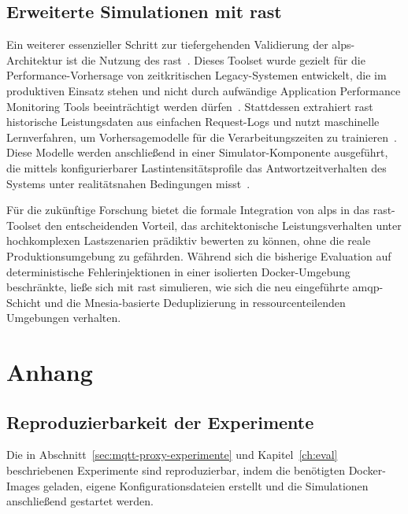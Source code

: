 \section{Erweiterte Simulationen mit \acrshort{rast}}
\label{sec:future-work-rast}

Ein weiterer essenzieller Schritt zur tiefergehenden Validierung der \gls{alps}-Architektur ist die Nutzung des \gls{rast}~\citep{rast}. Dieses Toolset wurde gezielt für die Performance-Vorhersage von zeitkritischen Legacy-Systemen entwickelt, die im produktiven Einsatz stehen und nicht durch aufwändige Application Performance Monitoring Tools beeinträchtigt werden dürfen~\citep{rast}. Stattdessen extrahiert \gls{rast} historische Leistungsdaten aus einfachen Request-Logs und nutzt maschinelle Lernverfahren, um Vorhersagemodelle für die Verarbeitungszeiten zu trainieren~\citep{rast}. Diese Modelle werden anschließend in einer Simulator-Komponente ausgeführt, die mittels konfigurierbarer Lastintensitätsprofile das Antwortzeitverhalten des Systems unter realitätsnahen Bedingungen misst~\citep{rast}.

Für die zukünftige Forschung bietet die formale Integration von \gls{alps} in das \gls{rast}-Toolset den entscheidenden Vorteil, das architektonische Leistungsverhalten unter hochkomplexen Lastszenarien prädiktiv bewerten zu können, ohne die reale Produktionsumgebung zu gefährden. Während sich die bisherige Evaluation auf deterministische Fehlerinjektionen in einer isolierten Docker-Umgebung beschränkte, ließe sich mit \gls{rast} simulieren, wie sich die neu eingeführte \gls{amqp}-Schicht und die Mnesia-basierte Deduplizierung in ressourcenteilenden Umgebungen verhalten.

\appendix

\chapter{Anhang}
\label{ch:anhang}

\section{Reproduzierbarkeit der Experimente}
\label{sec:appendix-reproducibility}

Die in Abschnitt~\ref{sec:mqtt-proxy-experimente} und Kapitel~\ref{ch:eval} beschriebenen Experimente sind reproduzierbar, indem die benötigten Docker-Images geladen, eigene Konfigurationsdateien erstellt und die Simulationen anschließend gestartet werden.

